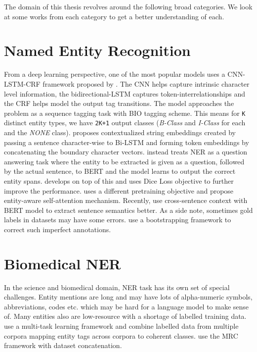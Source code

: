 The domain of this thesis revolves around the following broad categories. We look at some works from each category to get a better understanding of each.

\section{Named Entity Recognition}
From a deep learning perspective, one of the most popular models uses a CNN-LSTM-CRF framework proposed by \cite{ma2016end}. The CNN helps capture intrinsic character level information, the bidirectional-LSTM captures token-interrelationships and the CRF helps model the output tag transitions. The model approaches the problem as a sequence tagging task with BIO tagging scheme. This means for \texttt{K} distinct entity types, we have \texttt{2K+1} output classes (\textit{B-Class} and \textit{I-Class} for each and the \textit{NONE} class). \cite{akbik2018contextual} proposes contextualized string embeddings created by passing a sentence character-wise to Bi-LSTM and forming token embeddings by concatenating the boundary character vectors. \cite{li2019unified} instead treats NER as a question answering task where the entity to be extracted is given as a question, followed by the actual sentence, to BERT \cite{devlin2018bert} and the model learns to output the correct entity spans. \cite{li2019dice} develops on top of this and uses Dice Loss objective to further improve the performance. \cite{yamada2020luke} uses a different pretraining objective and propose entity-aware self-attention mechanism. Recently, \cite{luoma2020exploring} use cross-sentence context with BERT model to extract sentence semantics better. As a side note, sometimes gold labels in datasets may have some errors. \cite{wang2019crossweigh} use a bootstrapping framework to correct such imperfect annotations.

\section{Biomedical NER}
In the science and biomedical domain, NER task has its own set of special challenges. Entity mentions are long and may have lots of alpha-numeric symbols, abbreviations, codes etc. which may be hard for a language model to make sense of. Many entities also are low-resource with a shortage of labelled training data. \cite{wang2019cross} use a multi-task learning framework and combine labelled data from multiple corpora mapping entity tags across corpora to coherent classes. \cite{banerjee2019knowledge} use the MRC framework with dataset concatenation.

